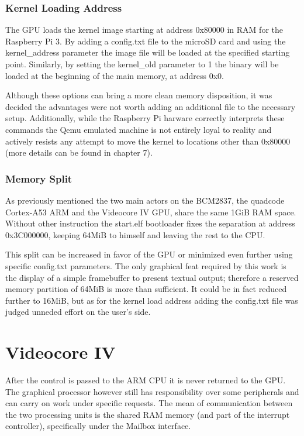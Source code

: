 \documentclass[12pt,a4paper,openright,twoside]{report}
\begin{document}
\subsubsection{Kernel Loading Address}
The GPU loads the kernel image starting at address 0x80000 in RAM for the
Raspberry Pi 3. By adding a config.txt file to the microSD card and using
the kernel\_address parameter the image file will be loaded at the specified
starting point. Similarly, by setting the kernel\_old parameter to 1 the binary
will be loaded at the beginning of the main memory, at address 0x0.

Although these options can bring a more clean memory disposition, it was decided
the advantages were not worth adding an additional file to the necessary setup.
Additionally, while the Raspberry Pi harware correctly interprets these commands
the Qemu emulated machine is not entirely loyal to reality and actively resists
any attempt to move the kernel to locations other than 0x80000 (more details can
be found in chapter 7).

\subsubsection{Memory Split}
As previously mentioned the two main actors on the BCM2837, the quadcode Cortex-A53 ARM
and the Videocore IV GPU, share the same 1GiB RAM space. Without other instruction
the start.elf bootloader fixes the separation at address 0x3C000000, keeping
64MiB to himself and leaving the rest to the CPU.

This split can be increased in favor of the GPU or minimized even further using
specific config.txt parameters. The only graphical feat required by this work
is the display of a simple framebuffer to present textual output; therefore
a reserved memory partition of 64MiB is more than sufficient.
It could be in fact reduced further to 16MiB, but as for the kernel load address 
adding the config.txt file was judged unneded effort on the user's side.

\section{Videocore IV}
After the control is passed to the ARM CPU it is never returned to the GPU.
The graphical processor however still has responsibility over some peripherals
and can carry on work under specific requests. The mean of communication 
between the two processing units is the shared RAM memory (and part of the interrupt
controller), specifically under the Mailbox interface.
\end{document}

